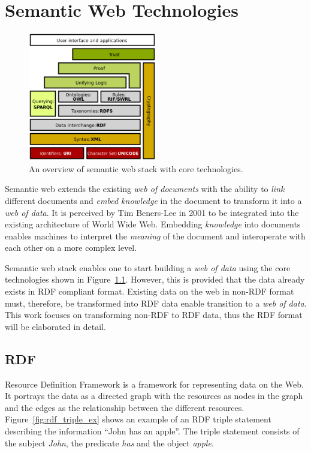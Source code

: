 \chapter{Semantic Web Technologies}


\begin{figure}[htbp]
    \centering
    \includegraphics[width=0.5\textwidth]{fig/Semantic_web_stack.svg.png}
    \caption{An overview of semantic web stack with core technologies\cite{sem_web_stack}.}
    \label{fig:sem_web_stack}
\end{figure}

Semantic web extends the existing \emph{web of documents} with the ability 
to \emph{link} different documents and \emph{embed knowledge} in the document
to transform it into a \emph{web of data}. It is perceived by Tim Beners-Lee in 
2001\cite{bernerslee2001semantic} to be integrated into the existing architecture 
of World Wide Web. Embedding \emph{knowledge} into documents enables machines to
interpret the \emph{meaning} of the document and interoperate with each other on 
a more complex level.

Semantic web stack enables one to start building a \emph{web of data} using 
the core technologies shown in Figure~\ref{fig:sem_web_stack}. 
However, this is provided that the data already exists in RDF compliant format.
Existing data on the web in non-RDF format must, therefore, be transformed 
into RDF data enable transition to a \emph{web of data}. This work 
focuses on transforming non-RDF to RDF data, thus the RDF format will be elaborated 
in detail. 



\section{RDF}
Resource Definition Framework \cite{rdf_concepts} is a framework for representing data on the Web.
It portrays the data as a directed graph with the resources as nodes in the graph and the
edges as the relationship between the different resources.
Figure~\ref{fig:rdf_triple_ex} shows an example of an RDF triple statement describing
the information “John has an apple”.
The triple statement consists of the subject \textit{John}, the predicate \textit{has}
and the object \textit{apple}.

